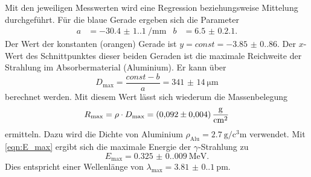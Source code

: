 Mit den jeweiligen Messwerten wird eine Regression beziehungsweise Mittelung durchgeführt. 
Für die blaue Gerade ergeben sich die Parameter
\begin{align*}
  a &= \qty{-30.4(1.1)}{\per\milli\metre} & b &= \num{6.5(0.21)}.
\end{align*}
Der Wert der konstanten (orangen) Gerade ist $y = const = \num{-3.85(0.86)}$.
Der $x$-Wert des Schnittpunktes dieser beiden Geraden ist die maximale Reichweite der Strahlung im Absorbermaterial (Aluminium). Er kann über
\begin{equation*}
  D_\text{max} = \frac{const -b}{a} = \qty{341(14)}{\micro\metre}
\end{equation*}
berechnet werden.
Mit diesem Wert lässt sich wiederum die Massenbelegung
\begin{equation*}
    R_\text{max} = \rho \cdot D_\text{max} = \qty{0.092+-0.004}{\gram\per\square\centi\metre}
\end{equation*}
ermitteln. Dazu wird die Dichte von Aluminium $\rho_\text{Alu} = \qty{2.7}{\gram\per\cubic\centi\metre}$ \cite{Gestis} verwendet.
Mit \autoref{eqn:E_max} ergibt sich die maximale Energie der $\gamma$-Strahlung zu
\begin{equation*}
  E_\text{max} = \qty{0.325(0.009)}{\mega\electronvolt}.
\end{equation*}
Dies entspricht einer Wellenlänge von $\lambda_\text{max} = \qty{3.81(0.10)}{\pico\metre}$.
